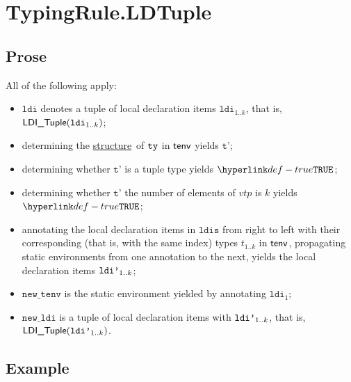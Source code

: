 \documentclass{book}
\newcommand\ProseOrTypeError[0]{\ProseTerminateAs{\TypeErrorConfig}}
\newcommand\structure[0]{\hyperlink{def-structure}{structure}}
\newcommand\newtenv[0]{\texttt{new\_tenv}}
\newcommand\ldi[0]{\texttt{ldi}}
\newcommand\ldis[0]{\texttt{ldis}}
\newcommand\newldi[0]{\texttt{new\_ldi}}
\newcommand\vtp[0]{\texttt{t'}}
\begin{document}

\section{TypingRule.LDTuple\label{sec:TypingRule.LDTuple}}

\subsection{Prose}
All of the following apply:
\begin{itemize}
  \item $\ldi$ denotes a tuple of local declaration items $\ldi_{1..k}$, that is, $\LDITuple(\ldi_{1..k})$;
  \item determining the \structure\ of $\texttt{ty}$ in $\textsf{tenv}$ yields $\vtp$\ProseOrTypeError;
  \item determining whether $\vtp$ is a tuple type yields $\True$\ProseOrTypeError;
  \item determining whether $\vtp$ the number of elements of $vtp$ is $k$ yields $\True$\ProseOrTypeError;
  \item annotating the local declaration items in $\ldis$ from right to left with their corresponding
        (that is, with the same index) types $t_{1..k}$ in $\textsf{tenv}$,
        propagating static environments from one annotation to the next,
        yields the local declaration items $\texttt{ldi'}_{1..k}$\ProseOrTypeError;
  \item $\newtenv$ is the static environment yielded by annotating $\ldi_1$;
  \item $\newldi$ is a tuple of local declaration items with $\texttt{ldi'}_{1..k}$, that is, \\
        $\textsf{LDI\_Tuple}(\texttt{ldi'}_{1..k})$.
\end{itemize}

\subsection{Example}

\end{document}
